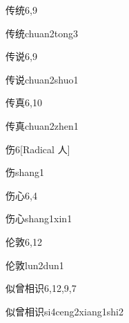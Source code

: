 \begin{entry}{传统}{6,9}
  \begin{phonetics}{传统}{chuan2tong3}
  \end{phonetics}
\end{entry}

\begin{entry}{传说}{6,9}
  \begin{phonetics}{传说}{chuan2shuo1}
  \end{phonetics}
\end{entry}

\begin{entry}{传真}{6,10}
  \begin{phonetics}{传真}{chuan2zhen1}
  \end{phonetics}
\end{entry}

\begin{entry}{伤}{6}[Radical 人]
  \begin{phonetics}{伤}{shang1}
  \end{phonetics}
\end{entry}

\begin{entry}{伤心}{6,4}
  \begin{phonetics}{伤心}{shang1xin1}
  \end{phonetics}
\end{entry}

\begin{entry}{伦敦}{6,12}
  \begin{phonetics}{伦敦}{lun2dun1}
  \end{phonetics}
\end{entry}

\begin{entry}{似曾相识}{6,12,9,7}
  \begin{phonetics}{似曾相识}{si4ceng2xiang1shi2}
  \end{phonetics}
\end{entry}

